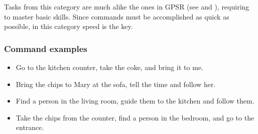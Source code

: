 Tasks from this category are much alike the ones in GPSR (see  and ), requiring to master basic skills. Since commands must be accomplished as quick as possible, in this category speed is the key.

\subsubsection{Command examples}
\begin{itemize}
	\item Go to the kitchen counter, take the coke, and bring it to me.
	\item Bring the chips to Mary at the sofa, tell the time and follow her.
	\item Find a person in the living room, guide them to the kitchen and follow them.
	\item Take the chips from the counter, find a person in the bedroom, and go to the entrance.
\end{itemize}

